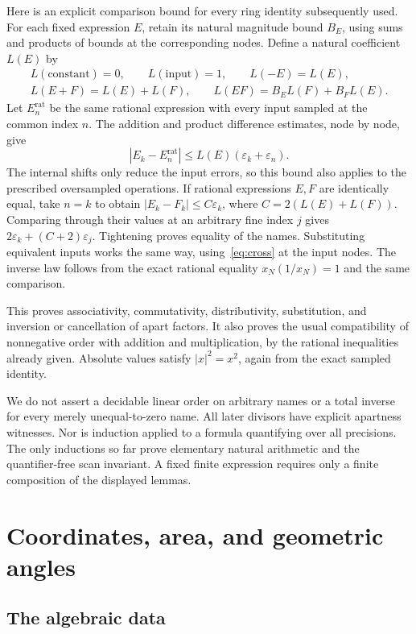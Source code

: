 \documentclass[11pt,a4paper]{article}
\theoremstyle{definition}
\newcommand{\eps}{\varepsilon}
\newcommand{\abs}[1]{\left|#1\right|}
\numberwithin{equation}{section}
\begin{document}
Here is an explicit comparison bound for every ring identity
subsequently used. For each fixed expression \(E\), retain its
natural magnitude bound \(B_E\), using sums and products of bounds
at the corresponding nodes. Define a natural coefficient \(L(E)\) by
\[
 \begin{gathered}
 L(\text{constant})=0,\qquad L(\text{input})=1,\qquad
 L(-E)=L(E),\\
 L(E+F)=L(E)+L(F),\qquad
 L(EF)=B_E L(F)+B_F L(E).
 \end{gathered}
\]
Let \(E^{\mathrm{rat}}_n\) be the same rational expression with
every input sampled at the common index \(n\).
The addition and product difference estimates, node by node, give
\[
 \abs{E_k-E^{\mathrm{rat}}_n}
 \le L(E)(\eps_k+\eps_n).
\]
The internal shifts only reduce the input errors, so this bound
also applies to the prescribed oversampled operations.
If rational expressions \(E,F\) are identically equal, take
\(n=k\) to obtain
\(\abs{E_k-F_k}\le C\eps_k\), where
\(C=2(L(E)+L(F))\).
Comparing through their values at an arbitrary fine index \(j\)
gives \(2\eps_k+(C+2)\eps_j\). Tightening proves equality
of the names. Substituting equivalent inputs works the same way,
using~\eqref{eq:cross} at the input nodes.
The inverse law follows from the exact rational equality
\(x_N(1/x_N)=1\) and the same comparison.

This proves associativity, commutativity, distributivity, substitution,
and inversion or cancellation of apart factors. It also proves the
usual compatibility of nonnegative order with addition and
multiplication, by the rational inequalities already given.
Absolute values satisfy \(\abs{x}^2=x^2\), again from the exact
sampled identity.

We do not assert a decidable linear order on arbitrary names or a
total inverse for every merely unequal-to-zero name. All later
divisors have explicit apartness witnesses. Nor is induction applied
to a formula quantifying over all precisions. The only inductions so
far prove elementary natural arithmetic and the quantifier-free scan
invariant. A fixed finite expression requires only a finite
composition of the displayed lemmas.

\section{Coordinates, area, and geometric angles}\label{sec:geometry}

\subsection{The algebraic data}
\end{document}
